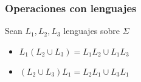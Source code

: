 \begin{frame}
  \frametitle{Operaciones con lenguajes}
			Sean $L_1, L_2, L_3$ lenguajes sobre $\Sigma$
      \begin{teor}
           \begin{itemize}[<+->]
           \item $L_1(L_2 \cup L_3) = L_1 L_2 \cup L_1 L_3$
           \item $(L_2 \cup L_3) L_1 = L_2 L_1 \cup L_3 L_1$
           \end{itemize}
      \end{teor}
\end{frame}
